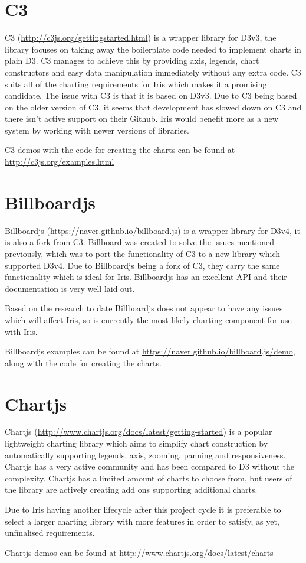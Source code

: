 \documentclass[12pt,a4paper,titlepage]{report}
\begin{document}
\begin{appendices}
\section{C3}

C3 (\url{http://c3js.org/gettingstarted.html}) is a wrapper library for D3v3, the library focuses on taking away the boilerplate code needed to implement charts in plain D3. C3 manages to achieve this by providing axis, legends, chart constructors and easy data manipulation immediately without any extra code. C3 suits all of the charting requirements for Iris which makes it a promising candidate. The issue with C3 is that it is based on D3v3. Due to C3 being based on the older version of C3, it seems that development has slowed down on C3 and there isn't active support on their Github. Iris would benefit more as a new system by working with newer versions of libraries.

C3 demos with the code for creating the charts can be found at \url{http://c3js.org/examples.html}
\section{Billboardjs}

Billboardjs (\url{https://naver.github.io/billboard.js}) is a wrapper library for D3v4, it is also a fork from C3. Billboard was created to solve the issues mentioned previously, which was to port the functionality of C3 to a new library which supported D3v4. Due to Billboardjs being a fork of C3, they carry the same functionality which is ideal for Iris. Billboardjs has an excellent API and their documentation is very well laid out. 

Based on the research to date Billboardjs does not appear to have any issues which will affect Iris, so is currently the most likely charting component for use with Iris.

Billboardjs examples can be found at \url{https://naver.github.io/billboard.js/demo}, 
along with the code for creating the charts.

\section{Chartjs}

Chartjs (\url{http://www.chartjs.org/docs/latest/getting-started}) is a popular lightweight charting library which aims to simplify chart construction by automatically supporting legends, axis, zooming, panning and responsiveness. Chartjs has a very active community and has been compared to D3 without the complexity. Chartjs has a limited amount of charts to choose from, but users of the library are actively creating add ons supporting additional charts. 

Due to Iris having another lifecycle after this project cycle it is preferable to select a larger charting library with more features in order to satisfy, as yet, unfinalised  requirements.

Chartjs demos can be found at \url{http://www.chartjs.org/docs/latest/charts}
\end{appendices}
\end{document}
